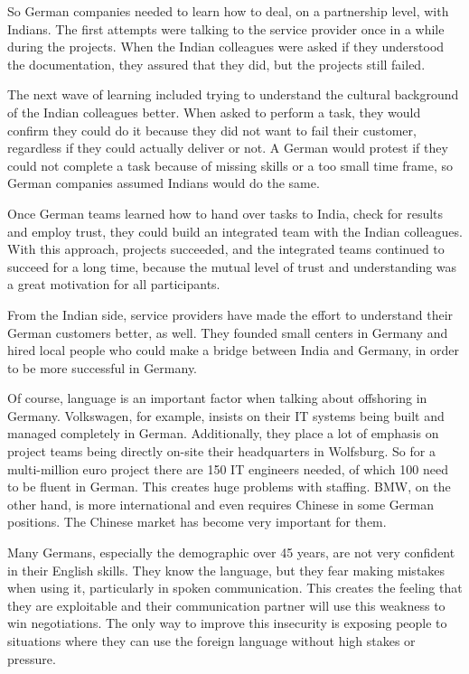 So German companies needed to learn how to deal, on a partnership level, with Indians. The first attempts were talking to the service provider once in a while during the projects. When the Indian colleagues were asked if they understood the documentation, they assured that they did, but the projects still failed.

The next wave of learning included trying to understand the cultural background of the Indian colleagues better. When asked to perform a task, they would confirm they could do it because they did not want to fail their customer, regardless if they could actually deliver or not. A German would protest if they could not complete a task because of missing skills or a too small time frame, so German companies assumed Indians would do the same.

Once German teams learned how to hand over tasks to India, check for results and employ trust, they could build an integrated team with the Indian colleagues. With this approach, projects succeeded, and the integrated teams continued to succeed for a long time, because the mutual level of trust and understanding was a great motivation for all participants.

From the Indian side, service providers have made the effort to understand their German customers better, as well. They founded small centers in Germany and hired local people who could make a bridge between India and Germany, in order to be more successful in Germany.

Of course, language is an important factor when talking about offshoring in Germany. Volkswagen, for example, insists on their IT systems being built and managed completely in German. Additionally, they place a lot of emphasis on project teams being directly on-site their headquarters in Wolfsburg. So for a multi-million euro project there are 150 IT engineers needed, of which 100 need to be fluent in German. This creates huge problems with staffing. BMW, on the other hand, is more international and even requires Chinese in some German positions. The Chinese market has become very important for them.

Many Germans, especially the demographic over 45 years, are not very confident in their English skills. They know the language, but they fear making mistakes when using it, particularly in spoken communication. This creates the feeling that they are exploitable and their communication partner will use this weakness to win negotiations. The only way to improve this insecurity is exposing people to situations where they can use the foreign language without high stakes or pressure.

